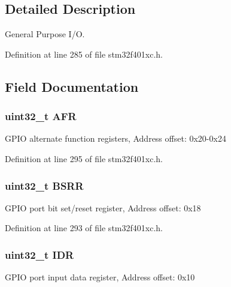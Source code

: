 \subsection{Detailed Description}
General Purpose I/O. 

Definition at line 285 of file stm32f401xc.\+h.



\subsection{Field Documentation}
\subsubsection[{\texorpdfstring{A\+FR}{AFR}}]{ uint32\+\_\+t A\+FR}\hypertarget{struct_g_p_i_o___type_def_a7100354be30ab2f2248e2c3e94ace993}{}\label{struct_g_p_i_o___type_def_a7100354be30ab2f2248e2c3e94ace993}
G\+P\+IO alternate function registers, Address offset\+: 0x20-\/0x24 

Definition at line 295 of file stm32f401xc.\+h.

\subsubsection[{\texorpdfstring{B\+S\+RR}{BSRR}}]{ uint32\+\_\+t B\+S\+RR}\hypertarget{struct_g_p_i_o___type_def_ac25dd6b9e3d55e17589195b461c5ec80}{}\label{struct_g_p_i_o___type_def_ac25dd6b9e3d55e17589195b461c5ec80}
G\+P\+IO port bit set/reset register, Address offset\+: 0x18 

Definition at line 293 of file stm32f401xc.\+h.

\subsubsection[{\texorpdfstring{I\+DR}{IDR}}]{ uint32\+\_\+t I\+DR}\hypertarget{struct_g_p_i_o___type_def_a328d2fe9ef1d513c3a97d30f98f0047c}{}\label{struct_g_p_i_o___type_def_a328d2fe9ef1d513c3a97d30f98f0047c}
G\+P\+IO port input data register, Address offset\+: 0x10 

